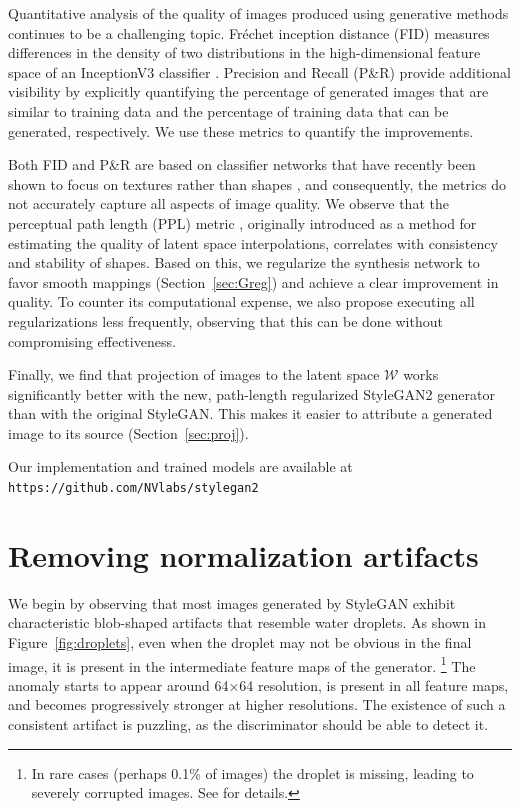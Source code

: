 \documentclass[10pt,twocolumn,letterpaper]{article}
\newcommand{\FINAL}[2][]{#2} %
\newcommand{\WW}{\mathcal{W}}
\begin{document}
Quantitative analysis of the quality of images produced using generative methods continues to be a challenging topic. 
Fr\'echet inception distance (FID) \cite{Heusel2017} measures differences in the density of two distributions in the high-dimensional feature space of an InceptionV3 classifier \cite{simonyan2014}. 
Precision and Recall (P\&R) \cite{Sajjadi2018,Tuomas2019} provide additional visibility by explicitly quantifying the percentage of generated images that are similar to training data and the percentage of training data that can be generated, respectively. 
We use these metrics to quantify the improvements.

Both FID and P\&R are based on classifier networks that have recently been shown to focus on textures rather than shapes \cite{Geirhos2018}, and consequently, the metrics do not accurately capture all aspects of image quality.
We observe that the perceptual path length (PPL) metric \cite{Karras2018}, originally introduced as a method for estimating the quality of latent space interpolations, correlates with consistency and stability of shapes.
Based on this, we regularize the synthesis network to favor smooth mappings (Section~\ref{sec:Greg}) and achieve a clear improvement in quality.
To counter its computational expense, we also propose executing all regularizations less frequently, observing that this can be done without compromising effectiveness.

Finally, we find that projection of images to the latent space $\WW$ works significantly better with the new, path-length regularized \FINAL{StyleGAN2 generator than with the original StyleGAN. 
This makes it easier to attribute a generated image to its source (Section~\ref{sec:proj}).}

Our implementation and trained models are available at \texttt{\small https://github.com/NVlabs/stylegan2}

\section{Removing normalization artifacts}
\label{sec:in}

\figarch %

We begin by observing that most images generated by StyleGAN exhibit characteristic blob-shaped artifacts that resemble water droplets.
As shown in Figure~\ref{fig:droplets}, even when the droplet may not be obvious in the final image, it is present in the intermediate feature maps of the generator.%
\footnote{In rare cases (perhaps 0.1\% of images) the droplet is missing, leading to severely corrupted images. See  for details.}
The anomaly starts to appear around 64$\times$64 resolution, is present in all feature maps, and becomes progressively stronger at higher resolutions.
The existence of such a consistent artifact is puzzling, as the discriminator should be able to detect it.
\end{document}
